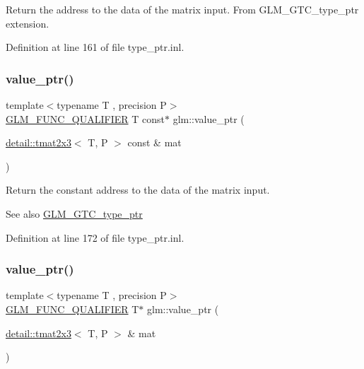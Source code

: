 Return the address to the data of the matrix input. From G\+L\+M\+\_\+\+G\+T\+C\+\_\+type\+\_\+ptr extension. 

Definition at line 161 of file type\+\_\+ptr.\+inl.

\mbox{\label{group__gtc__type__ptr_gad5c4faad7a4553c875bc45656fcae73c}} 
\subsubsection{\texorpdfstring{value\+\_\+ptr()}{value\_ptr()}\hspace{0.1cm}{\footnotesize\ttfamily [14/27]}}
{\footnotesize\ttfamily template$<$typename T , precision P$>$ \\
\hyperlink{setup_8hpp_a33fdea6f91c5f834105f7415e2a64407}{G\+L\+M\+\_\+\+F\+U\+N\+C\+\_\+\+Q\+U\+A\+L\+I\+F\+I\+ER} T const$\ast$ glm\+::value\+\_\+ptr (\begin{DoxyParamCaption}\item[{\hyperlink{structglm_1_1detail_1_1tmat2x3}{detail\+::tmat2x3}$<$ T, P $>$ const \&}]{mat }\end{DoxyParamCaption})}

Return the constant address to the data of the matrix input. \begin{DoxySeeAlso}{See also}
\hyperlink{group__gtc__type__ptr}{G\+L\+M\+\_\+\+G\+T\+C\+\_\+type\+\_\+ptr} 
\end{DoxySeeAlso}


Definition at line 172 of file type\+\_\+ptr.\+inl.

\mbox{\label{group__gtc__type__ptr_gaaba8179ff5559d8b4493499313eb7a02}} 
\subsubsection{\texorpdfstring{value\+\_\+ptr()}{value\_ptr()}\hspace{0.1cm}{\footnotesize\ttfamily [15/27]}}
{\footnotesize\ttfamily template$<$typename T , precision P$>$ \\
\hyperlink{setup_8hpp_a33fdea6f91c5f834105f7415e2a64407}{G\+L\+M\+\_\+\+F\+U\+N\+C\+\_\+\+Q\+U\+A\+L\+I\+F\+I\+ER} T$\ast$ glm\+::value\+\_\+ptr (\begin{DoxyParamCaption}\item[{\hyperlink{structglm_1_1detail_1_1tmat2x3}{detail\+::tmat2x3}$<$ T, P $>$ \&}]{mat }\end{DoxyParamCaption})}

